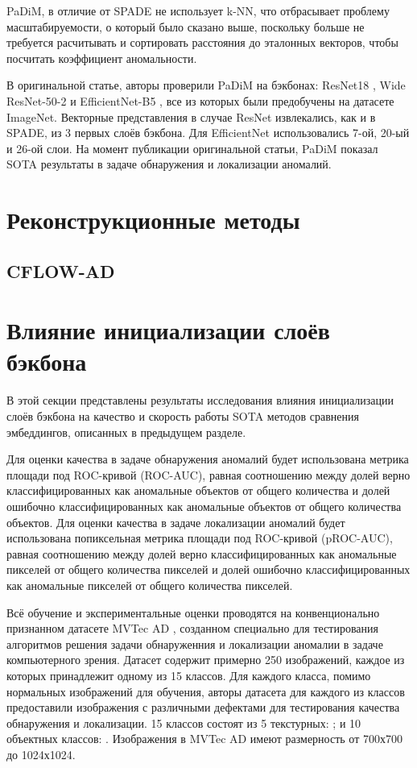 \documentclass{article}
\begin{document}
\begin{large}
PaDiM, в отличие от SPADE не использует k-NN, что отбрасывает проблему масштабируемости, о который было сказано выше, поскольку больше не требуется расчитывать и сортировать расстояния до эталонных векторов, чтобы посчитать коэффициент аномальности.

В оригинальной статье, авторы проверили PaDiM на бэкбонах: ResNet18 \cite{resnet}, Wide ResNet-50-2 \cite{wide} и EfficientNet-B5 \cite{efficient}, все из которых были предобучены на датасете ImageNet. Векторные представления в случае ResNet извлекались, как и в SPADE, из 3 первых слоёв бэкбона. Для EfficientNet использовались 7-ой, 20-ый и 26-ой слои. На момент публикации оригинальной статьи, PaDiM показал SOTA результаты в задаче обнаружения и локализации аномалий.


\section{Реконструкционные методы}

\subsection{CFLOW-AD}


\section{Влияние инициализации слоёв бэкбона}

В этой секции представлены результаты исследования влияния инициализации слоёв бэкбона на качество и скорость работы SOTA методов сравнения эмбеддингов, описанных в предыдущем разделе.

Для оценки качества в задаче обнаружения аномалий будет использована метрика площади под ROC-кривой (ROC-AUC), равная соотношению между долей верно классифицированных как аномальные объектов от общего количества и долей ошибочно классифицированных как аномальные объектов от общего количества объектов. Для оценки качества в задаче локализации аномалий будет использована попиксельная метрика площади под ROC-кривой (pROC-AUC), равная соотношению между долей верно классифицированных как аномальные пикселей от общего количества пикселей и долей ошибочно классифицированных как аномальные пикселей от общего количества пикселей.

Всё обучение и экспериментальные оценки проводятся на конвенционально признанном датасете MVTec AD \cite{mvtec}, созданном специально для тестирования алгоритмов решения задачи обнаруженния и локализации аномалии в задаче компьютерного зрения. Датасет содержит примерно 250 изображений, каждое из которых принадлежит одному из 15 классов. Для каждого класса, помимо нормальных изображений для обучения, авторы датасета для каждого из классов предоставили изображения с различными дефектами для тестирования качества обнаружения и локализации. 15 классов состоят из 5 текстурных: ; и 10 объектных классов: . Изображения в MVTec AD имеют размерность от 700х700 до 1024х1024.


\end{large}
\end{document}
